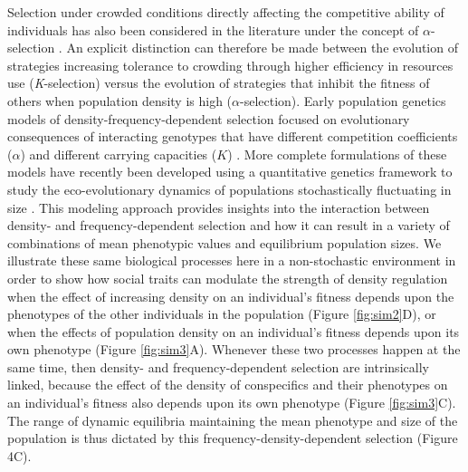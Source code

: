 \documentclass{article}
\begin{document}
 Selection under crowded conditions directly affecting the competitive ability of individuals has also been considered in the literature under the concept of ${\alpha}$-selection \citep{Joshi2001}. An explicit distinction can therefore be made between the evolution of strategies increasing tolerance to crowding through higher efficiency in resources use (\textit{K}-selection) versus the evolution of strategies that inhibit the fitness of others when population density is high (${\alpha}$-selection). Early population genetics models of density-frequency-dependent selection focused on evolutionary consequences of interacting genotypes that have different competition coefficients ($\alpha$) and different carrying capacities ($K$) \citep{Clarke1972, Anderson1983}. More complete formulations of these models have recently been developed using a quantitative genetics framework to study the eco-evolutionary dynamics of populations stochastically fluctuating in size \citep{Lande2007, Engen2020}. This modeling approach provides insights into the interaction between density- and frequency-dependent selection and how it can result in a variety of combinations of mean phenotypic values and equilibrium population sizes. We illustrate these same biological processes here in a non-stochastic environment in order to show how social traits can modulate the strength of density regulation when the effect of increasing density on an individual's fitness depends upon the phenotypes of the other individuals in the population (Figure \ref{fig:sim2}D), or when the effects of population density on an individual's fitness depends upon its own phenotype (Figure \ref{fig:sim3}A). Whenever these two processes happen at the same time, then density- and frequency-dependent selection are intrinsically linked, because the effect of the density of conspecifics and their phenotypes on an individual's fitness also depends upon its own phenotype (Figure \ref{fig:sim3}C). The range of dynamic equilibria maintaining the mean phenotype and size of the population is thus dictated by this frequency-density-dependent selection (Figure 4C).  
\end{document}
